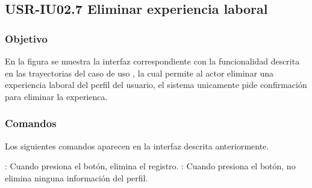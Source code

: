 \clearpage
\subsection{USR-IU02.7 Eliminar experiencia laboral}

\subsubsection{Objetivo}
En la figura  se muestra la interfaz correspondiente con la funcionalidad descrita en las
trayectorias del caso de uso  , la cual permite al actor eliminar una experiencia laboral del perfil del usuario, el sistema unicamente pide confirmación para eliminar la experienca.

\subsubsection{Comandos}
Los siguientes comandos aparecen en la interfaz descrita anteriormente.

\Titem {} : Cuando presiona el botón, elimina el registro.
\Titem {} : Cuando presiona el botón, no elimina ninguna información del perfil.%



\clearpage
